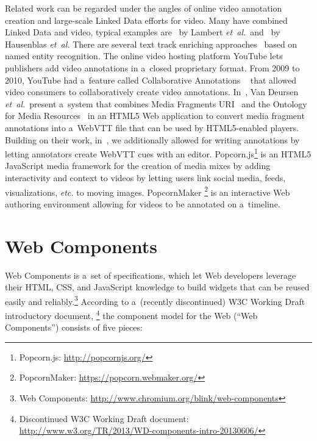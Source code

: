 \documentclass[runningheads,a4paper]{llncs}
\begin{document}
Related work can be regarded under the angles
of online video annotation creation and large-scale Linked Data 
efforts for video.
Many have combined Linked Data and video,
typical examples are~\cite{lambert2010linkeddata} by Lambert \emph{et~al.}\
and~\cite{hausenblas2009im} by Hausenblas \emph{et~al.}
There are several text track enriching approaches~\cite{li2013enriching,li2012creating,yi2012synote,steiner2010semwebvid}
based on named entity recognition.
The online video hosting platform YouTube
lets publishers add video annotations
in a~closed proprietary format.
From 2009 to 2010, YouTube had a~feature called
Collaborative Annotations%
~\cite{fink2009collaborativeannotations}
that allowed video consumers to collaboratively
create video annotations.
In~\cite{vandeursen2012mediafragmentannotations},
Van Deursen \emph{et~al.}\ present a~system
that combines Media Fragments URI~\cite{troncy2012mediafragments}
and the Ontology for Media Resources~\cite{lee2012mediaontology}
in an HTML5 Web application to convert
media fragment annotations into a~WebVTT file
that can be used by HTML5-enabled players.
Building on their work, in~\cite{steiner2014webvtt},
we additionally allowed for writing annotations by
letting annotators create WebVTT cues with an editor.
Popcorn.js\footnote{Popcorn.js: \url{http://popcornjs.org/}}
is an HTML5 JavaScript media framework
for the creation of media mixes
by adding interactivity and context to videos
by letting users link social media, feeds,
visualizations, \emph{etc.} to moving images.
PopcornMaker%
\footnote{PopcornMaker: \url{https://popcorn.webmaker.org/}}
is an interactive Web authoring environment
allowing for videos to be annotated on a~timeline.

\section{Web Components}

Web Components is a~set of specifications, which let Web developers leverage
their HTML, CSS, and JavaScript knowledge to build widgets
that can be reused easily and reliably.\footnote{Web Components:
\url{http://www.chromium.org/blink/web-components}}
According to a~(recently discontinued) W3C Working Draft introductory document,%
\footnote{Discontinued W3C Working Draft document:
\url{http://www.w3.org/TR/2013/WD-components-intro-20130606/}}
the component model for the Web (``Web Components'') consists of five pieces:
\end{document}
